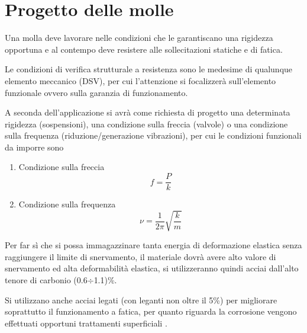 \documentclass[a4paper, 15pt]{article}
\begin{document}
\section{Progetto delle molle}
\begin{adjustwidth}{2in}{}	
	Una molla deve lavorare nelle condizioni che le garantiscano una rigidezza opportuna e al contempo deve resistere alle sollecitazioni statiche e di fatica. 
	
	Le condizioni di verifica strutturale a resistenza sono le medesime di qualunque elemento meccanico (DSV), per cui l'attenzione si focalizzerà sull'elemento funzionale ovvero sulla garanzia di funzionamento. \newline
	
	A seconda dell'applicazione si avrà come richiesta di progetto una determinata rigidezza (sospensioni), una condizione sulla freccia (valvole) o una condizione sulla frequenza (riduzione/generazione vibrazioni), per cui le condizioni funzionali da imporre sono 
	\begin{enumerate}
		\item Condizione sulla freccia 
		\[f = \dfrac{P}{k}\]
		
		\item Condizione sulla frequenza 
		\[\nu = \dfrac{1}{2\pi}\sqrt{\dfrac{k}{m}}\]
	\end{enumerate}
	Per far sì che si possa immagazzinare tanta energia di deformazione elastica senza raggiungere il limite di snervamento, il materiale dovrà avere alto valore di snervamento ed alta deformabilità elastica, si utilizzeranno quindi acciai dall'alto tenore di carbonio (0.6$\div$1.1)\%. 
	
	Si utilizzano anche acciai legati (con leganti non oltre il 5\%) per migliorare soprattutto il funzionamento a fatica, per quanto riguarda la corrosione vengono effettuati opportuni trattamenti superficiali . 
\end{adjustwidth}
\end{document}
